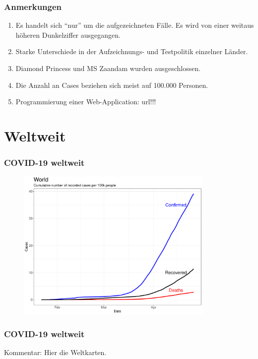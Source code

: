 \documentclass{beamer}
\begin{document}
 \begin{frame}
 	\frametitle{Anmerkungen}
 	\begin{enumerate}
 		\item Es handelt sich ``nur'' um die aufgezeichneten Fälle. Es wird von einer weitaus höheren Dunkelziffer ausgegangen. 
 		\item Starke Unterschiede in der Aufzeichnungs- und Testpolitik einzelner Länder.
 		\vspace{1cm}
 		\item Diamond Princess und MS Zaandam wurden ausgeschlossen.
 		\item Die Anzahl an Cases beziehen sich meist auf 100.000 Personen.
 		\item Programmierung einer Web-Application: url!!!
 	\end{enumerate}
 \end{frame}
 
 \section{Weltweit}
 \begin{frame}
 	\frametitle{COVID-19 weltweit}
	\begin{figure}
		\centering
		\includegraphics[width = 270pt]{Cases_world.pdf}
	\end{figure}
 \end{frame}

 \begin{frame}
 	\frametitle{COVID-19 weltweit}
	Kommentar: Hier die Weltkarten.
 \end{frame}
 
\end{document}
